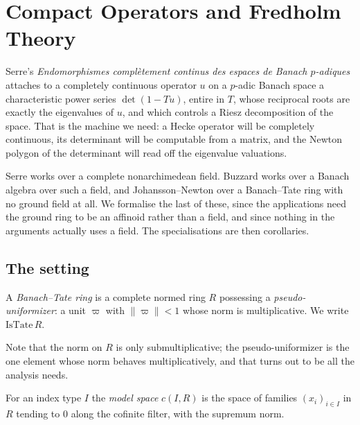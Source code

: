 \chapter{Compact Operators and Fredholm Theory}
\label{chap:compact}

Serre's \emph{Endomorphismes compl\`etement continus des espaces de Banach $p$-adiques}
\cite{Serre} attaches to a completely continuous operator $u$ on a $p$-adic Banach space a
characteristic power series $\det(1 - Tu)$, entire in $T$, whose reciprocal roots are exactly the
eigenvalues of $u$, and which controls a Riesz decomposition of the space.  That is the machine
we need: a Hecke operator will be completely continuous, its determinant will be computable from
a matrix, and the Newton polygon of the determinant will read off the eigenvalue valuations.

Serre works over a complete nonarchimedean field.  Buzzard \cite{Buzzard} works over a Banach
algebra over such a field, and Johansson--Newton \cite{JN} over a Banach--Tate ring with no
ground field at all.  We formalise the last of these, since the applications need the ground
ring to be an affinoid rather than a field, and since nothing in the arguments actually uses a
field.  The specialisations are then corollaries.

\section{The setting}

\begin{definition}
  \label{def:istate}
  \leanok
  A \emph{Banach--Tate ring} is a complete normed ring $R$ possessing a
  \emph{pseudo-uniformizer}: a unit $\varpi$ with $\lVert \varpi \rVert < 1$ whose norm is
  multiplicative.  We write $\mathrm{IsTate}\, R$.
\end{definition}

Note that the norm on $R$ is only submultiplicative; the pseudo-uniformizer is the one element
whose norm behaves multiplicatively, and that turns out to be all the analysis needs.

\begin{definition}
  \label{def:cspace}
  \leanok
  For an index type $I$ the \emph{model space} $c(I, R)$ is the space of families $(x_i)_{i \in
  I}$ in $R$ tending to $0$ along the cofinite filter, with the supremum norm.
\end{definition}


